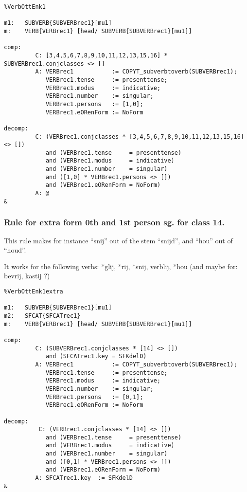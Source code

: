 \begin{verbatim}
%VerbOttEnk1

m1:   SUBVERB{SUBVERBrec1}[mu1]
m:    VERB{VERBrec1} [head/ SUBVERB{SUBVERBrec1}[mu1]]

comp:        
         C: [3,4,5,6,7,8,9,10,11,12,13,15,16] * SUBVERBrec1.conjclasses <> []
         A: VERBrec1           := COPYT_subverbtoverb(SUBVERBrec1);
            VERBrec1.tense     := presenttense;
            VERBrec1.modus     := indicative;
            VERBrec1.number    := singular;
            VERBrec1.persons   := [1,0];
            VERBrec1.eORenForm := NoForm

decomp:      
         C: (VERBrec1.conjclasses * [3,4,5,6,7,8,9,10,11,12,13,15,16] <> [])
            and (VERBrec1.tense     = presenttense)                  
            and (VERBrec1.modus     = indicative)                    
            and (VERBrec1.number    = singular)                      
            and ([1,0] * VERBrec1.persons <> [])
            and (VERBrec1.eORenForm = NoForm) 
         A: @
&
\end{verbatim}
\newpage
\subsubsection{Rule for extra form 0th and 1st person sg. for class 14.}
This rule makes for instance ``snij'' out of the stem ``snijd'', and ``hou'' 
out of ``houd''.

It works for the following verbs: *glij, *rij, *snij, verblij, *hou 
(and maybe for: bevrij, kastij ?)

\begin{verbatim}
%VerbOttEnk1extra

m1:   SUBVERB{SUBVERBrec1}[mu1]
m2:   SFCAT{SFCATrec1}
m:    VERB{VERBrec1} [head/ SUBVERB{SUBVERBrec1}[mu1]]

comp:        
         C: (SUBVERBrec1.conjclasses * [14] <> [])
            and (SFCATrec1.key = SFKdelD)
         A: VERBrec1           := COPYT_subverbtoverb(SUBVERBrec1);
            VERBrec1.tense     := presenttense;
            VERBrec1.modus     := indicative;
            VERBrec1.number    := singular;
            VERBrec1.persons   := [0,1];
            VERBrec1.eORenForm := NoForm

decomp:      
          C: (VERBrec1.conjclasses * [14] <> []) 
            and (VERBrec1.tense     = presenttense)
            and (VERBrec1.modus     = indicative)
            and (VERBrec1.number    = singular)
            and ([0,1] * VERBrec1.persons <> [])
            and (VERBrec1.eORenForm = NoForm)
         A: SFCATrec1.key  := SFKdelD
&
\end{verbatim}
\newpage
